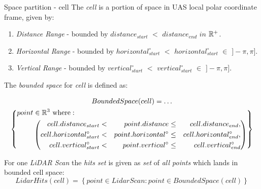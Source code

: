 \begin{definition}{Space partition - cell}\label{def:cell}
    The \emph{cell} is a portion of space in UAS local polar coordinate frame, given by:
    \begin{enumerate}
        \item \emph{Distance Range} -  bounded by $distance_{start}$ $<$ $distance_{end}$ $in$ $\mathbb{R}^+$.
        \item \emph{Horizontal Range} - bounded by $horizontal^\circ_{start}$ $<$ $horizontal^\circ_{start}$ $\in$ $]-\pi,\pi]$.
        \item \emph{Vertical Range} - bounded by $vertical^\circ_{start}$ $<$ $vertical^\circ_{start}$ $\in$ $]-\pi,\pi]$.
    \end{enumerate}
    
    \noindent The \emph{bounded space} for \emph{cell} is defined as:
    
    \begin{multline}\label{eq:boundedSpaceCell}
        Bounded Space(cell)=\dots\\
            \left \{
                \begin{aligned}
                point& \in \mathbb{R}^3 \text{ where}:\\
                    &\left(\begin{aligned}
                        cell.distance_{start} &<& point.distance &\le& cell.distance_{end},\\
                        cell.horizontal^\circ_{start} &<& point.horizontal^\circ &\le&  cell.horizontal^\circ_{end},\\
                        cell.vertical^\circ_{start} &<& point.vertical^\circ &\le& cell.vertical^\circ_{end}\\
                    \end{aligned}\right)
                \end{aligned}
            \right\}
    \end{multline}
    
    \noindent For one \emph{LiDAR Scan} the \emph{hits set} is given as \emph{set} of \emph{all points} which lands in bounded cell space:
    \begin{equation}\label{eq:LidarHitsCell}
        Lidar Hits (cell) = \left\{point \in Lidar Scan:  point \in Bounded Space(cell)\right\}    
    \end{equation}
    

\end{definition}
